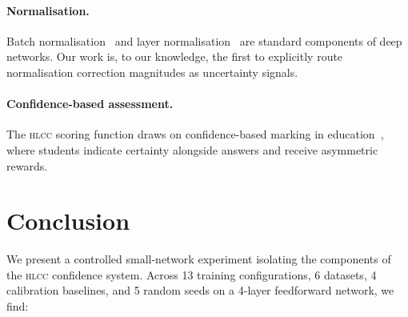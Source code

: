\documentclass[11pt,a4paper]{article}
\newcommand{\hlcc}{\textsc{hlcc}}
\begin{document}
\paragraph{Normalisation.}
Batch normalisation~\cite{ioffe2015batch} and layer
normalisation~\cite{ba2016layer} are standard components of deep
networks.  Our work is, to our knowledge, the first to explicitly
route normalisation correction magnitudes as uncertainty signals.

\paragraph{Confidence-based assessment.}
The \hlcc{} scoring function draws on confidence-based marking in
education~\cite{mccallum2010gamedesign, gardnermedwin1995}, where
students indicate certainty alongside answers and receive
asymmetric rewards.

\section{Conclusion}
\label{sec:conclusion}

We present a controlled small-network experiment isolating the
components of the \hlcc{} confidence system.  Across 13 training
configurations, 6 datasets, 4 calibration baselines, and 5 random
seeds on a 4-layer feedforward network, we find:
\end{document}
